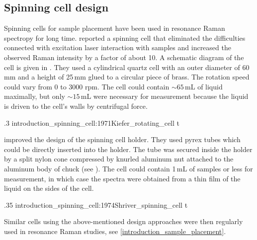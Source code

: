 \subsection{Spinning cell design}
\label{introduction_spinning_cell}

Spinning cells for sample placement have been used in resonance Raman spectropy
for long time.
\textcite{Kiefer1971}
reported a spinning cell that eliminated the difficulties connected with
excitation laser interaction with samples and increased the observed Raman
intensity by a factor of about 10. A schematic diagram of the cell is given in
.
They used a cylindrical quartz cell with an outer diameter of 60\,mm and a
height of 25\,mm glued to a circular piece of brass.
The rotation speed could vary from 0 to 3000 rpm.
The cell could contain $\sim 65$\,mL of liquid maximally, but only
$\sim 15$\,mL were necessary for measurement because the liquid is driven to
the cell's walls by centrifugal force.

%
{.3}%
{introduction_spinning_cell:1971Kiefer_rotating_cell}%
{t}

\textcite{Shriver1974} improved the design of the spinning cell holder.
They used pyrex tubes which could be directly inserted into the holder.
The tube was secured inside the holder by a split nylon cone compressed by
knurled aluminum nut attached to the aluminum body of chuck (see
).
The cell could contain 1\,mL of samples or less for measurement, in which case
the spectra were obtained from a thin film of the liquid on the sides of the
cell.

%
{.35}%
{introduction_spinning_cell:1974Shriver_spinning_cell}
{t}

Similar cells using the above-mentioned design approaches were then regularly
used in resonance Raman studies, see
\cref{introduction_sample_placement}.
